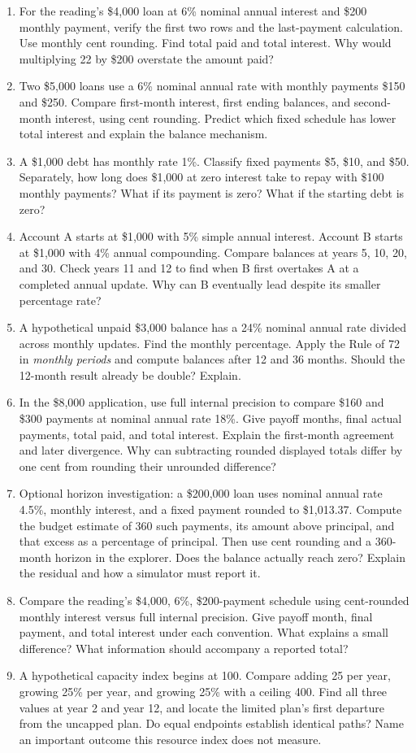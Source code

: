 \documentclass[11pt,letterpaper]{article}
\begin{document}
\begin{enumerate}
\item For the reading's \$4,000 loan at 6\% nominal annual interest and \$200 monthly payment, verify the first two rows and the last-payment calculation. Use monthly cent rounding. Find total paid and total interest. Why would multiplying 22 by \$200 overstate the amount paid?
\newpage
\item Two \$5,000 loans use a 6\% nominal annual rate with monthly payments \$150 and \$250. Compare first-month interest, first ending balances, and second-month interest, using cent rounding. Predict which fixed schedule has lower total interest and explain the balance mechanism.
\item A \$1,000 debt has monthly rate 1\%. Classify fixed payments \$5, \$10, and \$50. Separately, how long does \$1,000 at zero interest take to repay with \$100 monthly payments? What if its payment is zero? What if the starting debt is zero?
\item Account A starts at \$1,000 with 5\% simple annual interest. Account B starts at \$1,000 with 4\% annual compounding. Compare balances at years 5, 10, 20, and 30. Check years 11 and 12 to find when B first overtakes A at a completed annual update. Why can B eventually lead despite its smaller percentage rate?
\item A hypothetical unpaid \$3,000 balance has a 24\% nominal annual rate divided across monthly updates. Find the monthly percentage. Apply the Rule of 72 in \emph{monthly periods} and compute balances after 12 and 36 months. Should the 12-month result already be double? Explain.
\item In the \$8,000 application, use full internal precision to compare \$160 and \$300 payments at nominal annual rate 18\%. Give payoff months, final actual payments, total paid, and total interest. Explain the first-month agreement and later divergence. Why can subtracting rounded displayed totals differ by one cent from rounding their unrounded difference?
\item Optional horizon investigation: a \$200,000 loan uses nominal annual rate 4.5\%, monthly interest, and a fixed payment rounded to \$1,013.37. Compute the budget estimate of 360 such payments, its amount above principal, and that excess as a percentage of principal. Then use cent rounding and a 360-month horizon in the explorer. Does the balance actually reach zero? Explain the residual and how a simulator must report it.
\item Compare the reading's \$4,000, 6\%, \$200-payment schedule using cent-rounded monthly interest versus full internal precision. Give payoff month, final payment, and total interest under each convention. What explains a small difference? What information should accompany a reported total?
\item A hypothetical capacity index begins at 100. Compare adding 25 per year, growing 25\% per year, and growing 25\% with a ceiling 400. Find all three values at year 2 and year 12, and locate the limited plan's first departure from the uncapped plan. Do equal endpoints establish identical paths? Name an important outcome this resource index does not measure.
\end{enumerate}
\end{document}
